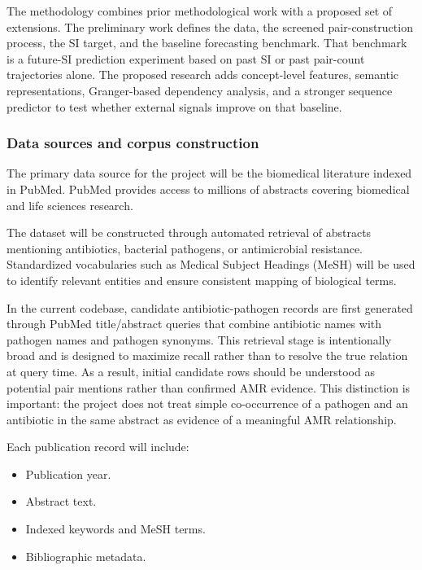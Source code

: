 \documentclass[
]{article}
\providecommand{\tightlist}{%
  \setlength{\itemsep}{0pt}\setlength{\parskip}{0pt}}
\begin{document}
The methodology combines prior methodological work with a proposed set
of extensions. The preliminary work defines the data, the screened
pair-construction process, the SI target, and the baseline forecasting
benchmark. That benchmark is a future-SI prediction experiment based on
past SI or past pair-count trajectories alone. The proposed research
adds concept-level features, semantic representations, Granger-based
dependency analysis, and a stronger sequence predictor to test whether
external signals improve on that baseline.

\subsubsection{Data sources and corpus
construction}\label{41-data-sources-and-corpus-construction}

The primary data source for the project will be the biomedical
literature indexed in PubMed. PubMed provides access to millions of
abstracts covering biomedical and life sciences research.

The dataset will be constructed through automated retrieval of abstracts
mentioning antibiotics, bacterial pathogens, or antimicrobial
resistance. Standardized vocabularies such as Medical Subject Headings
(MeSH) will be used to identify relevant entities and ensure consistent
mapping of biological terms.

In the current codebase, candidate antibiotic-pathogen records are first
generated through PubMed title/abstract queries that combine antibiotic
names with pathogen names and pathogen synonyms. This retrieval stage is
intentionally broad and is designed to maximize recall rather than to
resolve the true relation at query time. As a result, initial candidate
rows should be understood as potential pair mentions rather than
confirmed AMR evidence. This distinction is important: the project does
not treat simple co-occurrence of a pathogen and an antibiotic in the
same abstract as evidence of a meaningful AMR relationship.

Each publication record will include:

\begin{itemize}
\tightlist
\item
  Publication year.
\item
  Abstract text.
\item
  Indexed keywords and MeSH terms.
\item
  Bibliographic metadata.
\end{itemize}
\end{document}
